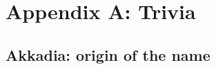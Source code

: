 \chapter{Appendix A: Trivia}
\label{trivia}

\section{Akkadia: origin of the name}
\label{trivia:akkadia}
